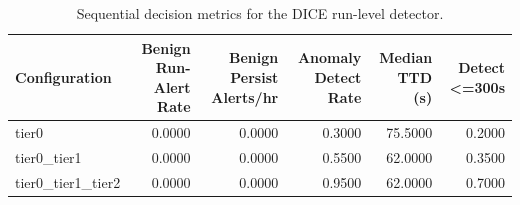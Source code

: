 \begin{table}[t]
\centering
\caption{Sequential decision metrics for the DICE run-level detector.}
\label{tab:dice_sequential_metrics}
\footnotesize
\begin{tabular}{lrrrrr}
\toprule
Configuration & Benign Run-Alert Rate & Benign Persist Alerts/hr & Anomaly Detect Rate & Median TTD (s) & Detect <=300s \\
\midrule
tier0 & 0.0000 & 0.0000 & 0.3000 & 75.5000 & 0.2000 \\
tier0_tier1 & 0.0000 & 0.0000 & 0.5500 & 62.0000 & 0.3500 \\
tier0_tier1_tier2 & 0.0000 & 0.0000 & 0.9500 & 62.0000 & 0.7000 \\
\bottomrule
\end{tabular}

\end{table}
